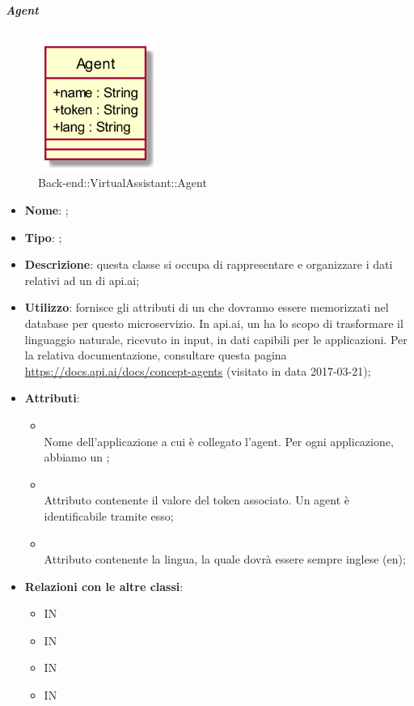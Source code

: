 \hypertarget{Agent_label}{\subparagraph{Agent}}
\begin{figure}[h]
	\centering
	\includegraphics[width=0.35\textwidth,height=\textheight,keepaspectratio]{images/ClassAgent.png}
	\caption{Back-end::VirtualAssistant::Agent}
\end{figure}
\begin{itemize}
	\item \textbf{Nome}: ;
	\item \textbf{Tipo}: ;
	\item \textbf{Descrizione}: questa classe si occupa di rappresentare e organizzare i dati relativi ad un  di api.ai;
	\item \textbf{Utilizzo}: fornisce gli attributi di un  che dovranno essere memorizzati nel database per questo microservizio.
In api.ai, un  ha lo scopo di trasformare il linguaggio naturale, ricevuto in input, in dati capibili per le applicazioni.
Per la relativa documentazione, consultare questa pagina \url{https://docs.api.ai/docs/concept-agents} (visitato in data 2017-03-21);
	\item \textbf{Attributi}:
	\begin{itemize}
		\item[]  \\
		Nome dell'applicazione a cui è collegato l'agent.
Per ogni applicazione, abbiamo un ;
		\item[]  \\
		Attributo contenente il valore del token associato. Un agent è identificabile tramite esso;
		\item[]  \\
		Attributo contenente la lingua, la quale dovrà essere sempre inglese (en);
	\end{itemize}
	\item \textbf{Relazioni con le altre classi}:
	\begin{itemize}
		\item IN \hyperlink{<<interface>> AgentsDAO_label}{}
		\item IN \hyperlink{AgentObserver_label}{}
		\item IN \hyperlink{AgentsDAODynamoDB_label}{}
		\item IN \hyperlink{ApiAiVAAdapter_label}{}
	\end{itemize}
\end{itemize}
\FloatBarrier

